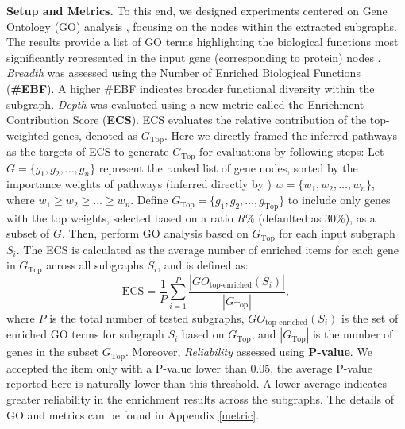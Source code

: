 \noindent\textbf{Setup and Metrics. }
To this end, we designed experiments centered on Gene Ontology (GO) analysis \cite{GO}, focusing on the nodes within the extracted subgraphs. 
The results provide a list of GO terms highlighting the biological functions most significantly represented in the input gene (corresponding to protein) nodes \cite{GO}.
\textit{Breadth} was assessed using the Number of Enriched Biological Functions (\textbf{\#EBF}). 
A higher \#EBF indicates broader functional diversity within the subgraph.
\textit{Depth} was evaluated using a new metric called the Enrichment Contribution Score (\textbf{ECS}).
ECS evaluates the relative contribution of the top-weighted genes, denoted as \( G_{\text{Top}} \).
Here we directly framed the inferred pathways as the targets of ECS to generate \( G_{\text{Top}} \) for evaluations by following steps:
Let \( G = \{ g_1, g_2, \dots, g_n \} \) represent the ranked list of gene nodes, sorted by the importance weights of pathways (inferred directly by \explainer) \( w = \{ w_1, w_2, \dots, w_n \} \), where \( w_1 \ge w_2 \ge \dots \ge w_n \).  
Define \( G_{\text{Top}} = \{ g_1, g_2, \dots, g_{\text{Top}} \} \) to include only genes with the top weights, selected based on a ratio \( R\% \) (defaulted as 30\%), as a subset of \( G \).
Then, perform GO analysis based on \( G_{\text{Top}} \) for each input subgraph \( S_i \).
The ECS is calculated as the average number of enriched items for each gene in \( G_{\text{Top}} \) across all subgraphs \( S_i \), and is defined as:
\[
\text{ECS} = \frac{1}{P} \sum_{i=1}^{P} \frac{|GO_{\text{top-enriched}}(S_i)|}{|G_{\text{Top}}|},
\]
where \( P \) is the total number of tested subgraphs, \( GO_{\text{top-enriched}}(S_i) \) is the set of enriched GO terms for subgraph \( S_i \) based on \( G_{\text{Top}} \), and \( |G_{\text{Top}}| \) is the number of genes in the subset \( G_{\text{Top}} \).
Moreover, \textit{Reliability} assessed using \textbf{P-value}.
We accepted the item only with a P-value lower than 0.05, the average P-value reported here is naturally lower than this threshold.
A lower average indicates greater reliability in the enrichment results across the subgraphs.
The details of GO and metrics can be found in Appendix \ref{metric}.





